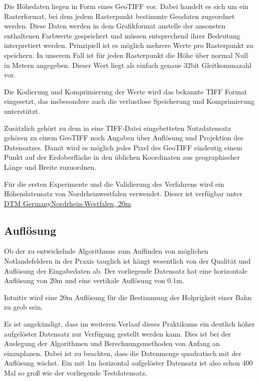 \documentclass[
11pt, %
a4paper, %
oneside, %
pdfspacing, %
headinclude,
BCOR5mm, %
ngerman, %
bibtotocnumbered,
]{scrartcl}
\begin{document}
Die Höhedaten liegen in Form eines GeoTIFF vor. Dabei handelt es sich um ein Rasterformat, bei dem jedem Rasterpunkt bestimmte Geodaten zugeordnet werden. Diese Daten werden in dem Grafikformat anstelle der ansonsten enthaltenen Farbwerte gespeichert und müssen entsprechend ihrer Bedeutung interpretiert werden. Prinzipiell ist es möglich mehrere Werte pro Rasterpunkt zu speichern. In unserem Fall ist für jeden Rasterpunkt die Höhe über normal Null in Metern angegeben. Dieser Wert liegt als einfach genaue 32bit Gleitkommazahl vor.

Die Kodierung und Komprimierung der Werte wird das bekannte TIFF Format eingesetzt, das insbesondere auch die verlustlose Speicherung und Komprimierung unterstützt.

Zusätzlich gehört zu dem in eine TIFF-Datei eingebetteten Nutzdatensatz gehören zu einem GeoTIFF noch Angaben über Auflösung und Projektion des Datensatzes. Damit wird es möglich jedes Pixel des GeoTIFF eindeutig einem Punkt auf der Erdoberfläche in den üblichen Koordinaten aus geographischer Länge und Breite zuzuordnen.

Für die ersten Experimente und die Validierung des Verfahrens wird ein Höhendatensatz von Nordrheinwestfalen verwendet. Dieser ist verfügbar unter \href{http://data.opendataportal.at/dataset/dtm-germany/resource/08d8c183-a4cc-4a7b-84a0-d03f92076ed3}{DTM Germany\textunderscore Nordrhein-Westfalen, 20m}


	\subsection{Auflösung}
	Ob der zu entwickelnde Algorithmus zum Auffinden von möglichen Notlandefeldern in der Praxis tauglich ist hängt wesentlich von der Qualität und Auflösung der Eingabedaten ab. Der vorliegende Datensatz hat eine horizontale Auflösung von 20m und eine vertikale Auflösung von 0.1m. 
	
	Intuitiv wird eine 20m Auflösung für die Bestimmung der Holprigkeit einer Bahn zu grob sein. 
	
	Es ist angekündigt, dass im weiteren Verlauf dieses Praktikums ein deutlich höher aufgelöster Datensatz zur Verfügung gestellt werden kann. Dies ist bei der Auslegung der Algorithmen und Berechnungsmethoden von Anfang an einzuplanen. Dabei ist zu beachten, dass die Datenmenge quadratisch mit der Auflösung wächst. Ein mit 1m horizontal aufgelöster Datensatz ist also schon 400 Mal so groß wie der vorliegende Testdatensatz.
	
\end{document}
